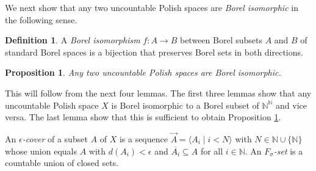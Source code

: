 \documentclass[10pt]{amsart}
\newcommand{\RR}{\mathbb{R}}
\newcommand{\NN}{\mathbb{N}}
\newtheorem{proposition}[theorem]{Proposition}
\theoremstyle{definition}
\newtheorem{definition}[theorem]{Definition}
\theoremstyle{remark}
\newenvironment{enumerate-(a)}{\begin{enumerate}[label={\upshape (\alph*)}, leftmargin=2pc]}{\end{enumerate}}
\begin{document}
\bigskip 
We next show that any two uncountable Polish spaces are \emph{Borel isomorphic} in the following sense. 

\begin{definition} 
A \emph{Borel isomorphism} $f\colon A\rightarrow B$ between Borel subsets $A$ and $B$ of standard Borel spaces is a bijection that preserves Borel sets in both directions. 
\end{definition} 

\begin{proposition} \label{Borel isomorphism of Polish spaces} 
Any two uncountable Polish spaces are Borel isomorphic. 
\end{proposition} 

This will follow from the next four lemmas. The first three lemmas show that any uncountable Polish space $X$ is Borel isomorphic to a Borel subset of $\NN^\NN$ and vice versa. The last lemma show that this is sufficient to obtain Proposition \ref{Borel isomorphism of Polish spaces}. 

An \emph{$\epsilon$-cover} of a subset $A$ of $X$ is a sequence $\vec{A}=\langle A_i\mid i<N\rangle$ with $N\in \NN\cup\{\NN\}$ whose union equals $A$ with $d(A_i)<\epsilon$ and $\overline{A_i}\subseteq A$ for all $i\in\NN$. 
An \emph{$F_\sigma$-set} is a countable union of closed sets. 
\end{document}
